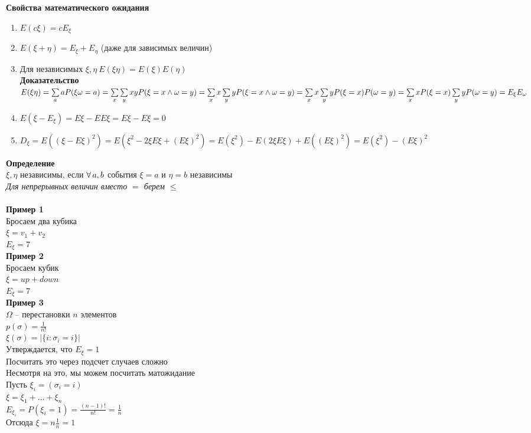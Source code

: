 \documentclass[12pt]{article}
\begin{document}
\textbf{Свойства математического ожидания}
\begin{enumerate}
    \item $E(c\xi) = cE_\xi$
    \item $E(\xi+\eta) = E_\xi + E_\eta$ (даже для зависимых величин)
    \item Для независимых $\xi, \eta\ E(\xi\eta)=E(\xi)E(\eta)$\\
    \textbf{Доказательство}\\
    $E(\xi\eta) = \sum\limits_a aP(\xi\omega = a) = \sum\limits_x\sum\limits_yxyP(\xi = x \land \omega=y)=\sum\limits_xx\sum\limits_yyP(\xi=x\land\omega=y) = \sum\limits_xx\sum\limits_yyP(\xi=x)P(\omega=y) = \sum\limits_xxP(\xi=x)\sum\limits_yyP(\omega=y)=E_\xi E_\omega$
    \item $E(\xi-E_\xi) = E\xi-EE\xi = E\xi-E\xi=0$
    \item $D_\xi = E((\xi-E\xi)^2)=E(\xi^2-2\xi E\xi + (E\xi)^2)=E(\xi^2)-E(2\xi E\xi)+E((E\xi)^2) = E(\xi^2)-(E\xi)^2$
\end{enumerate}
\textbf{Определение}\\
$\xi, \eta$ независимы, если $\forall\, a,b$ события $\xi = a$ и $\eta = b$ независимы\\
\textit{Для непрерывных величин вместо $=$ берем $\leq$}\\\\
\textbf{Пример 1}\\
Бросаем два кубика\\
$\xi = v_1 + v_2$\\
$E_\xi = 7$\\
\textbf{Пример 2}\\
Бросаем кубик\\
$\xi=up+down$\\
$E_\xi = 7$\\
\textbf{Пример 3}\\
$\Omega$ -- перестановки $n$ элементов\\
$p(\sigma) = \frac{1}{n!}$\\
$\xi(\sigma)=|\{i: \sigma_i = i\}|$\\
Утверждается, что $E_\xi = 1$\\
Посчитать это через подсчет случаев сложно\\
Несмотря на это, мы можем посчитать матожидание\\
Пусть $\xi_i = (\sigma_i = i)$\\
$\xi = \xi_1 + \ldots + \xi_n$\\
$E_{\xi_i} = P(\xi_i = 1) = \frac{(n-1)!}{n!} = \frac1n$\\
Отсюда $\xi = n\frac1n = 1$\\\\
\end{document}

